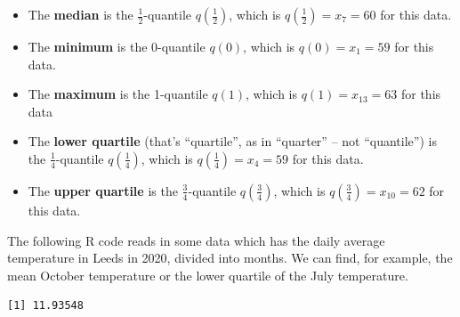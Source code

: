 \documentclass[
  letterpaper,
]{report}
\newenvironment{Shaded}{\begin{snugshade}}{\end{snugshade}}
\newcommand{\AttributeTok}[1]{\textcolor[rgb]{0.40,0.45,0.13}{#1}}
\newcommand{\DecValTok}[1]{\textcolor[rgb]{0.68,0.00,0.00}{#1}}
\newcommand{\FunctionTok}[1]{\textcolor[rgb]{0.28,0.35,0.67}{#1}}
\newcommand{\NormalTok}[1]{\textcolor[rgb]{0.00,0.23,0.31}{#1}}
\newcommand{\OtherTok}[1]{\textcolor[rgb]{0.00,0.23,0.31}{#1}}
\newcommand{\SpecialCharTok}[1]{\textcolor[rgb]{0.37,0.37,0.37}{#1}}
\newcommand{\StringTok}[1]{\textcolor[rgb]{0.13,0.47,0.30}{#1}}
\providecommand{\tightlist}{%
  \setlength{\itemsep}{0pt}\setlength{\parskip}{0pt}}\usepackage{longtable,booktabs,array}
\theoremstyle{definition}
\theoremstyle{definition}
\theoremstyle{remark}
\begin{document}
\begin{itemize}
\tightlist
\item
  The \textbf{median} is the \(\frac12\)-quantile \(q(\frac12)\), which
  is \(q(\frac12) = x_7 = 60\) for this data.
\item
  The \textbf{minimum} is the 0-quantile \(q(0)\), which is
  \(q(0) = x_1 = 59\) for this data.
\item
  The \textbf{maximum} is the 1-quantile \(q(1)\), which is
  \(q(1) = x_{13} = 63\) for this data
\item
  The \textbf{lower quartile} (that's ``quartile'', as in ``quarter'' --
  not ``quantile'') is the \(\frac14\)-quantile \(q(\frac14)\), which is
  \(q(\frac14) = x_4 = 59\) for this data.
\item
  The \textbf{upper quartile} is the \(\frac34\)-quantile
  \(q(\frac34)\), which is \(q(\frac34) = x_{10} = 62\) for this data.
\end{itemize}

The following R code reads in some data which has the daily average
temperature in Leeds in 2020, divided into months. We can find, for
example, the mean October temperature or the lower quartile of the July
temperature.

\begin{Shaded}
\end{Shaded}

\begin{verbatim}
[1] 11.93548
\end{verbatim}

\begin{Shaded}
\end{Shaded}
\end{document}
